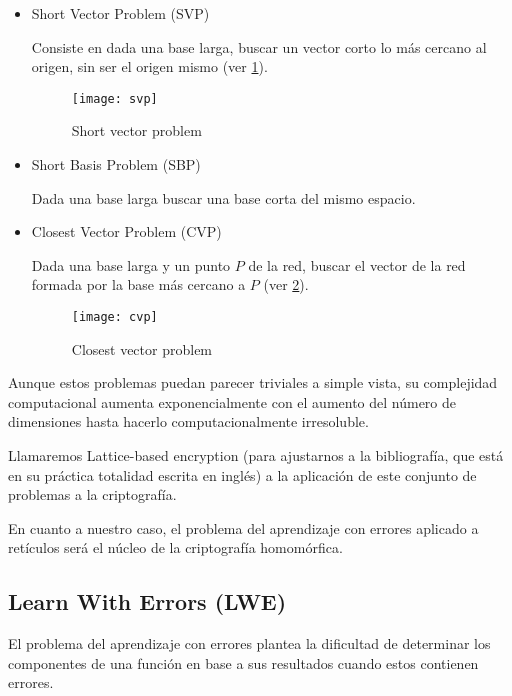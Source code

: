 \begin{itemize}
  \item Short Vector Problem (SVP)

  Consiste en dada una base larga, buscar un vector corto lo más cercano al origen, sin ser el origen mismo (ver \ref{fig:svp}).

  \begin{figure}[h]
    \caption{Short vector problem \cite{noauthor_lattice_2019}}
    \label{fig:svp}
    \texttt{[image: svp]}
  \end{figure}

  \item Short Basis Problem (SBP)

  Dada una base larga buscar una base corta del mismo espacio.

  \item Closest Vector Problem (CVP)

  Dada una base larga y un punto $P$ de la red, buscar el vector de la red formada por la base más cercano a $P$ (ver \ref{fig:cvp}).

  \begin{figure}[h]
    \caption{Closest vector problem \cite{noauthor_lattice_2019}}
    \label{fig:cvp}
    \texttt{[image: cvp]}
  \end{figure}


\end{itemize}

Aunque estos problemas puedan parecer triviales a simple vista, su complejidad computacional aumenta exponencialmente con el aumento del número de dimensiones hasta hacerlo computacionalmente irresoluble.

Llamaremos Lattice-based encryption (para ajustarnos a la bibliografía, que está en su práctica totalidad escrita en inglés) a la aplicación de este conjunto de problemas a la criptografía.

En cuanto a nuestro caso, el problema del aprendizaje con errores aplicado a retículos será el núcleo de la criptografía homomórfica.

\subsection{Learn With Errors (LWE)}

El problema del aprendizaje con errores plantea la dificultad de determinar los componentes de una función en base a sus resultados cuando estos contienen errores\cite{apon_intro_nodate}.

